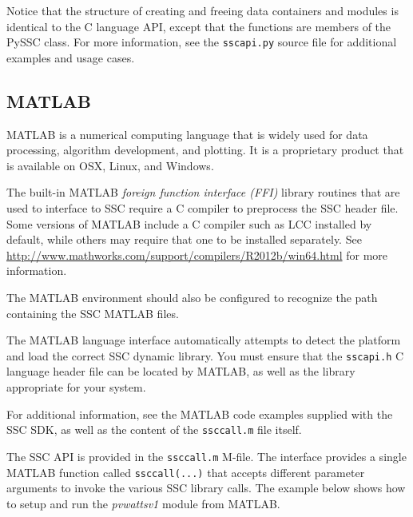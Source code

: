 \documentclass{scrartcl} %
\begin{document}
Notice that the structure of creating and freeing data containers and modules is identical to the C language API, except that the functions are members of the PySSC class.  For more information, see the \texttt{sscapi.py} source file for additional examples and usage cases.

\subsection{MATLAB}

MATLAB is a numerical computing language that is widely used for data processing, algorithm development, and plotting.  It is a proprietary product that is available on OSX, Linux, and Windows.  

The built-in MATLAB \emph{foreign function interface (FFI)} library routines that are used to interface to SSC require a C compiler to preprocess the SSC header file. Some versions of MATLAB include a C compiler such as LCC installed by default, while others may require that one to be installed separately.  See \url{http://www.mathworks.com/support/compilers/R2012b/win64.html} for more information.

The MATLAB environment should also be configured to recognize the path containing the SSC MATLAB files.

The MATLAB language interface automatically attempts to detect the platform and load the correct SSC dynamic library.  You must ensure that the \texttt{sscapi.h} C language header file can be located by MATLAB, as well as the library appropriate for your system.  

For additional information, see the MATLAB code examples supplied with the SSC SDK, as well as the content of the \texttt{ssccall.m} file itself.

The SSC API is provided in the \texttt{ssccall.m} M-file.  The interface provides a single MATLAB function called \texttt{ssccall(...)} that accepts different parameter arguments to invoke the various SSC library calls.  The example below shows how to setup and run the \emph{pvwattsv1} module from MATLAB.
\end{document}
